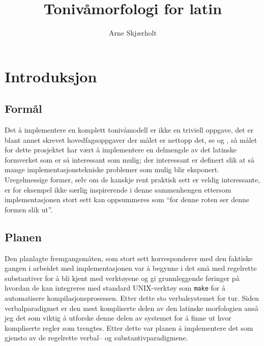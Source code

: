 \documentclass{article}
\title{Toniv\aa{}morfologi for latin}
\author{Arne Skj\ae{}rholt}
\begin{document}
\maketitle
\tableofcontents

\section{Introduksjon}
\subsection{Form\aa{}l}
Det \aa{} implementere en komplett toniv\aa{}modell er ikke en triviell
oppgave, det er blant annet skrevet hovedfagsoppgaver der m\aa{}let er nettopp
det, se \cite{bondihoved} og \cite{french}, s\aa{} m\aa{}let for dette
prosjektet har v\ae{}rt \aa{} implementere en delmengde av det latinske
formverket som er s\aa{} interessant som mulig; der interessant er definert
slik at s\aa{} mange implementasjonstekniske problemer som mulig blir
eksponert. Uregelmessige former, selv om de kanskje rent praktisk sett er
veldig interessante, er for eksempel ikke s\ae{}rlig inspirerende i denne
sammenhengen ettersom implementasjonen stort sett kan oppsummeres som ``for
denne roten ser denne formen slik ut''.


\subsection{Planen}
Den planlagte fremgangsm\aa{}ten, som stort sett korresponderer med den
faktiske gangen i arbeidet med implementasjonen var \aa{} begynne i det
sm\aa{} med regelrette substantiver for \aa{} bli kjent med verkt\o{}yene og
gi grunnleggende f\o{}ringer p\aa{} hvordan de kan integreres med standard
UNIX-verkt\o{}y som \texttt{make} for \aa{} automatisere
kompilasjonsprosessen. Etter dette sto verbalsystemet for tur. Siden
verbalparadigmet er den mest kompliserte delen av den latinske morfologien
ans\aa{} jeg det som viktig \aa{} utforske denne delen av systemet for \aa{}
finne ut hvor kompliserte regler som trengtes. Etter dette var planen \aa{}
implementere det som gjensto av de regelrette verbal-- og
substantivparadigmene.
\end{document}

